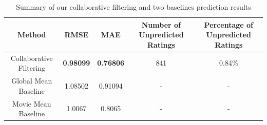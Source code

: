 \begin{table}[!ht]
  \centering
  \begin{tabular}{|c|c|c|c|c|}
    \hline
    Method & RMSE & MAE & Number of Unpredicted Ratings & Percentage of Unpredicted Ratings \\
    \hline
  Collaborative Filtering & \textbf{0.98099}  & \textbf{0.76806} & 841 & 0.84\%\\
\hline
Global Mean Baseline & 1.08502 & 0.91094 & - & - \\
\hline
Movie Mean Baseline & 1.0067 & 0.8065& - &- \\
    \hline
  \end{tabular}
  \caption{Summary of our collaborative filtering and two baselines prediction results}
  \label{tab:finres}
\end{table}


